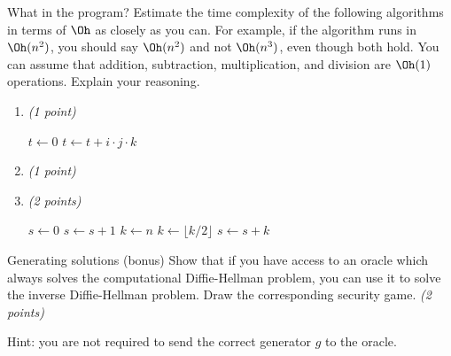 \documentclass{homework}
\begin{document}
\begin{task}{What in the program?}
  Estimate the time complexity of the following algorithms in terms of $\Oh$ as closely as you can.
  For example, if the algorithm runs in $\Oh(n^2)$, you should say $\Oh(n^2)$ and not $\Oh(n^3)$, even though both hold.
  You can assume that addition, subtraction, multiplication, and division are $\Oh(1)$ operations.
  Explain your reasoning.

  \begin{enumerate}
    \item \textit{(1 point)}
    \begin{algorithmic}[1]
      \State $t \gets 0$
            \State $t \gets t + i \cdot j \cdot k$
          \EndFor
        \EndFor
      \EndFor
      \State{}
      \EndProcedure
    \end{algorithmic}

    \item \textit{(1 point)}
    \begin{algorithmic}[1]
      \EndIf
      \State{}
      \EndProcedure
    \end{algorithmic}

    \item \textit{(2 points)}
    \begin{algorithmic}[1]
      \State $s \gets 0$
        \State $s \gets s + 1$
        \State $k \gets n$
          \State $k \gets \lfloor k/2 \rfloor$
          \State $s \gets s + k$
        \EndWhile
      \EndFor
      \State{}
      \EndProcedure
    \end{algorithmic}
  \end{enumerate}
\end{task}

\newpage

\begin{task}{Generating solutions (bonus)}
  Show that if you have access to an oracle which always solves the computational Diffie-Hellman problem, you can use it to solve the inverse Diffie-Hellman problem.
  Draw the corresponding security game.
  \textit{(2 points)}

  Hint: you are not required to send the correct generator $g$ to the oracle.
\end{task}
\end{document}
